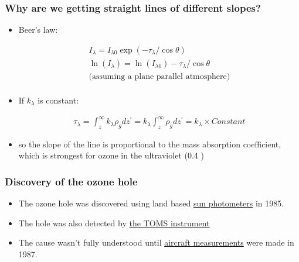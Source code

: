 \documentclass[hyperref={colorlinks=true,linkcolor=blue,urlcolor=blue},numbers]{beamer}
\begin{document}
\begin{frame}
  \frametitle{Why are we getting straight lines of different slopes?}

  \begin{itemize}
  \item Beer's law:

    \begin{gather*}
      I_\lambda = I_{\lambda 0} \exp \left (  -\tau_\lambda /\cos \theta \right ) \\
\ln(I_\lambda) = \ln(I_{\lambda 0}) - \tau_\lambda /\cos \theta \\
\text{(assuming a plane parallel atmosphere})\\
    \end{gather*}


\item If $k_\lambda$ is constant:

  \begin{gather*}
\tau_\lambda = \int_z^\infty k_\lambda \rho_g dz^\prime    = k_\lambda \int_z^\infty \rho_g dz^\prime = k_\lambda \times Constant
  \end{gather*}


\item so the slope of the line is proportional to the mass absorption coefficient, which is strongest for ozone
in the ultraviolet (0.4 \mum)

  \end{itemize}

\end{frame}

\begin{frame}
  \frametitle{Discovery of the ozone hole }

  \begin{itemize}
  \item The ozone hole was discovered using land based 
\href{http://www.yesinc.com/products/data/spuv10/index.html}{sun photometers}
in 1985.

\item The hole was also detected by 
\href{http://www.nas.nasa.gov/About/Education/Ozone/history.html}{the TOMS instrument}


\item The cause wasn't fully understood until 
\href{http://ozonewatch.gsfc.nasa.gov/facts/history.html}{aircraft measurements} were made in
1987.


  \end{itemize}
\end{frame}
\end{document}
